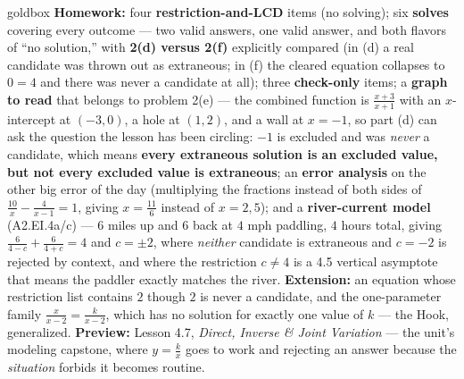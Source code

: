 \documentclass[10pt]{article}
\begin{document}
\begin{skillbox}{goldbox}
\textbf{Homework:} four \textbf{restriction-and-LCD} items (no solving); six \textbf{solves} covering
every outcome --- two valid answers, one valid answer, and both flavors of ``no solution,'' with
\textbf{2(d) versus 2(f)} explicitly compared (in (d) a real candidate was thrown out as extraneous; in
(f) the cleared equation collapses to $0=4$ and there was never a candidate at all); three
\textbf{check-only} items; a \textbf{graph to read} that belongs to problem 2(e) --- the combined
function is $\frac{x+3}{x+1}$ with an $x$-intercept at $(-3,0)$, a hole at $(1,2)$, and a wall at
$x=-1$, so part (d) can ask the question the lesson has been circling: $-1$ is excluded and was
\emph{never} a candidate, which means \textbf{every extraneous solution is an excluded value, but not
every excluded value is extraneous}; an \textbf{error analysis} on the other big error of the day
(multiplying the fractions instead of both sides of $\frac{10}{x}-\frac{4}{x-1}=1$, giving
$x=\frac{11}{6}$ instead of $x=2,5$); and a \textbf{river-current model} (A2.EI.4a/c) --- $6$ miles up
and $6$ back at $4$ mph paddling, $4$ hours total, giving $\frac{6}{4-c}+\frac{6}{4+c}=4$ and
$c=\pm2$, where \emph{neither} candidate is extraneous and $c=-2$ is rejected by context, and where the
restriction $c\neq4$ is a 4.5 vertical asymptote that means the paddler exactly matches the river.
\textbf{Extension:} an equation whose restriction list contains $2$ though $2$ is never a candidate,
and the one-parameter family $\frac{x}{x-2}=\frac{k}{x-2}$, which has no solution for exactly one value
of $k$ --- the Hook, generalized. \textbf{Preview:} Lesson 4.7, \emph{Direct, Inverse \& Joint
Variation} --- the unit's modeling capstone, where $y=\frac kx$ goes to work and rejecting an answer
because the \emph{situation} forbids it becomes routine.
\end{skillbox}
\end{document}
